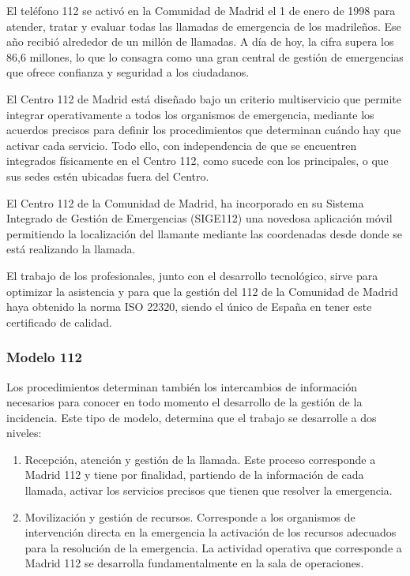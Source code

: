 El teléfono 112 se activó en la Comunidad de Madrid el 1 de enero de 1998 para atender, tratar y evaluar todas las llamadas de emergencia de los madrileños. Ese año recibió alrededor de un millón de llamadas. A día de hoy, la cifra supera los 86,6 millones, lo que lo consagra como una gran central de gestión de emergencias que ofrece confianza y seguridad a los ciudadanos.

El Centro 112 de Madrid está diseñado bajo un criterio multiservicio que permite integrar operativamente a todos los organismos de emergencia, mediante los acuerdos precisos para definir los procedimientos que determinan cuándo hay que activar cada servicio. Todo ello, con independencia de que se encuentren integrados físicamente en el Centro 112, como sucede con los principales, o que sus sedes estén ubicadas fuera del Centro.

El Centro 112 de la Comunidad de Madrid, ha incorporado en su Sistema Integrado de Gestión de Emergencias (SIGE112) una novedosa aplicación móvil permitiendo la localización del llamante mediante las coordenadas desde donde se está realizando la llamada.

El trabajo de los profesionales, junto con el desarrollo tecnológico, sirve para optimizar la asistencia y para que la gestión del 112 de la Comunidad de Madrid haya obtenido la norma ISO 22320, siendo el único de España en tener este certificado de calidad.

\subsubsection{Modelo 112}

Los procedimientos determinan también los intercambios de información necesarios para conocer en todo momento el desarrollo de la gestión de la incidencia. Este tipo de modelo, determina que el trabajo se desarrolle a dos niveles:

\begin{enumerate}
  \item Recepción, atención y gestión de la llamada. Este proceso corresponde a Madrid 112 y tiene por finalidad, partiendo de la información de cada llamada, activar los servicios precisos que tienen que resolver la emergencia.
  \item Movilización y gestión de recursos. Corresponde a los organismos de intervención directa en la emergencia la activación de los recursos adecuados para la resolución de la emergencia. La actividad operativa que corresponde a Madrid 112 se desarrolla fundamentalmente en la sala de operaciones.
\end{enumerate}

